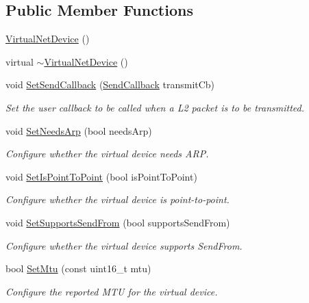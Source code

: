 \subsection*{Public Member Functions}
\begin{DoxyCompactItemize}
\item 
\hyperlink{classns3_1_1VirtualNetDevice_ab77801a18776a510358ed65a76d81467}{Virtual\+Net\+Device} ()
\item 
virtual \hyperlink{classns3_1_1VirtualNetDevice_a152e936756c7377d127db78197227502}{$\sim$\+Virtual\+Net\+Device} ()
\item 
void \hyperlink{classns3_1_1VirtualNetDevice_ae4e54639e40bf1c5d8d6ed7da9ababed}{Set\+Send\+Callback} (\hyperlink{classns3_1_1VirtualNetDevice_aebf725ef61f43759033989504a83dd7f}{Send\+Callback} transmit\+Cb)
\begin{DoxyCompactList}\small\item\em Set the user callback to be called when a L2 packet is to be transmitted. \end{DoxyCompactList}\item 
void \hyperlink{classns3_1_1VirtualNetDevice_a601faebbf94efb6a9dcd27f671198a81}{Set\+Needs\+Arp} (bool needs\+Arp)
\begin{DoxyCompactList}\small\item\em Configure whether the virtual device needs A\+RP. \end{DoxyCompactList}\item 
void \hyperlink{classns3_1_1VirtualNetDevice_aaf6525f4404af8404fe21a7a70d52be9}{Set\+Is\+Point\+To\+Point} (bool is\+Point\+To\+Point)
\begin{DoxyCompactList}\small\item\em Configure whether the virtual device is point-\/to-\/point. \end{DoxyCompactList}\item 
void \hyperlink{classns3_1_1VirtualNetDevice_a499659f98c264ba457bbff8b44cd49e7}{Set\+Supports\+Send\+From} (bool supports\+Send\+From)
\begin{DoxyCompactList}\small\item\em Configure whether the virtual device supports Send\+From. \end{DoxyCompactList}\item 
bool \hyperlink{classns3_1_1VirtualNetDevice_a3277a3167e1519924a3bcdf795314178}{Set\+Mtu} (const uint16\+\_\+t mtu)
\begin{DoxyCompactList}\small\item\em Configure the reported M\+TU for the virtual device. \end{DoxyCompactList}\item 

\end{DoxyCompactItemize}

